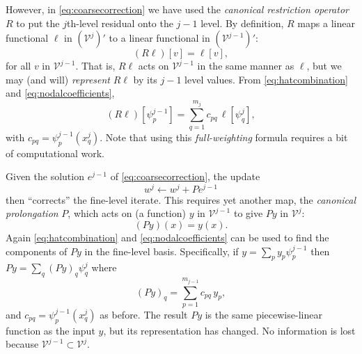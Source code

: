 \documentclass[letterpaper,final,12pt,reqno]{amsart}
\theoremstyle{claim}
\numberwithin{equation}{section}
\numberwithin{figure}{section}
\numberwithin{table}{section}
\numberwithin{theorem}{section}
\begin{document}
However, in \eqref{eq:coarsecorrection} we have used the \emph{canonical restriction operator} $R$ to put the $j$th-level residual onto the $j-1$ level.  By definition, $R$ maps a linear functional $\ell$ in $(\mathcal{V}^j)'$ to a linear functional in $(\mathcal{V}^{j-1})'$:
\begin{equation}
  (R \ell)[v] = \ell[v], \label{eq:canonicalrestriction}
\end{equation}
for all $v$ in $\mathcal{V}^{j-1}$.  That is, $R \ell$ acts on $\mathcal{V}^{j-1}$ in the same manner as $\ell$, but we may (and will) \emph{represent} $R\ell$ by its $j-1$ level values.  From \eqref{eq:hatcombination} and \eqref{eq:nodalcoefficients},
\begin{equation}
  (R \ell)[\psi_p^{j-1}] = \sum_{q=1}^{m_j} c_{pq}\, \ell[\psi_q^j], \label{eq:canonicalrestrictionaction}
\end{equation}
with $c_{pq}=\psi_p^{j-1}(x_q^j)$.  Note that using this \emph{full-weighting} formula \cite{Briggsetal2000} requires a bit of computational work.

Given the solution $e^{j-1}$ of \eqref{eq:coarsecorrection}, the update
\begin{equation}
  w^j \gets w^j + P e^{j-1}  \label{eq:update}
\end{equation}
then ``corrects'' the fine-level iterate.  This requires yet another map, the \emph{canonical prolongation} $P$, which acts on (a function) $y$ in $\mathcal{V}^{j-1}$ to give $Py$ in $\mathcal{V}^j$:
\begin{equation}
  (P y)(x) = y(x). \label{eq:canonicalprolongation}
\end{equation}
Again \eqref{eq:hatcombination} and \eqref{eq:nodalcoefficients} can be used to find the components of $Py$ in the fine-level basis.  Specifically, if $y=\sum_p y_p \psi_p^{j-1}$ then $Py = \sum_q (Py)_q \psi_q^j$ where
\begin{equation}
  (Py)_q = \sum_{p=1}^{m_{j-1}} c_{pq}\, y_p, \label{eq:canonicalprolongationaction}
\end{equation}
and $c_{pq} = \psi_p^{j-1}(x_q^j)$ as before.  The result $P y$ is the same piecewise-linear function as the input $y$, but its representation has changed.  No information is lost because $\mathcal{V}^{j-1} \subset \mathcal{V}^j$.
\end{document}
